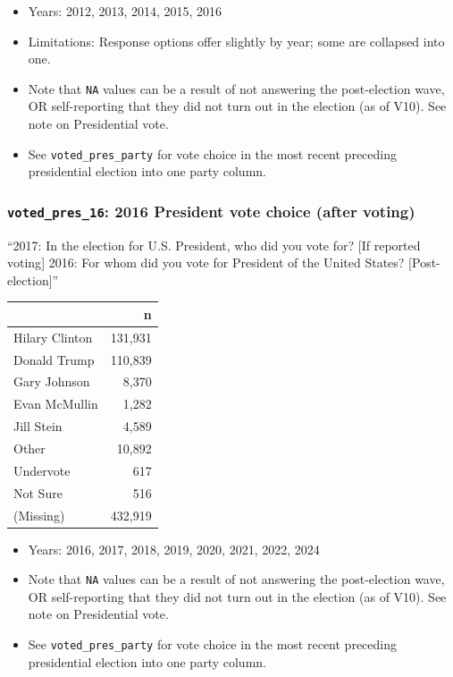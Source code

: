\documentclass[10pt,article,oneside]{memoir}
\begin{document}
\begin{itemize}
\tightlist
\item
  Years: 2012, 2013, 2014, 2015, 2016
\item
  Limitations: Response options offer slightly by year; some are
  collapsed into one.
\item
  Note that \texttt{NA} values can be a result of not answering the
  post-election wave, OR self-reporting that they did not turn out in
  the election (as of V10). See note on Presidential vote.
\item
  See \texttt{voted\_pres\_party} for vote choice in the most recent
  preceding presidential election into one party column.
\end{itemize}

\subsubsection{\texorpdfstring{\texttt{voted\_pres\_16}: 2016 President
vote choice (after
voting)}{voted\_pres\_16: 2016 President vote choice (after voting)}}\label{voted_pres_16-2016-president-vote-choice-after-voting}

``2017: In the election for U.S. President, who did you vote for? {[}If
reported voting{]} 2016: For whom did you vote for President of the
United States? {[}Post-election{]}''

\begin{table}[H]
\centering
\begin{tabular}[t]{lr}
\toprule
 & n\\
\midrule
Hilary Clinton & 131,931\\
Donald Trump & 110,839\\
Gary Johnson & 8,370\\
Evan McMullin & 1,282\\
Jill Stein & 4,589\\
Other & 10,892\\
Undervote & 617\\
Not Sure & 516\\
(Missing) & 432,919\\
\bottomrule
\end{tabular}
\end{table}

\begin{itemize}
\tightlist
\item
  Years: 2016, 2017, 2018, 2019, 2020, 2021, 2022, 2024
\item
  Note that \texttt{NA} values can be a result of not answering the
  post-election wave, OR self-reporting that they did not turn out in
  the election (as of V10). See note on Presidential vote.
\item
  See \texttt{voted\_pres\_party} for vote choice in the most recent
  preceding presidential election into one party column.
\end{itemize}
\end{document}
